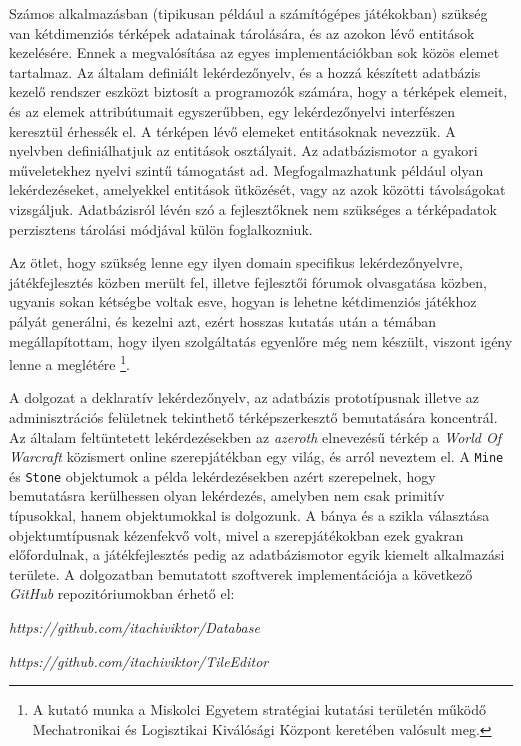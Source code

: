 
Számos alkalmazásban (tipikusan például a számítógépes játékokban) szükség  van kétdimenziós térképek adatainak tárolására, és az azokon lévő entitások kezelésére. Ennek a megvalósítása az egyes implementációkban sok közös elemet tartalmaz. Az általam definiált lekérdezőnyelv, és a hozzá készített adatbázis kezelő rendszer eszközt biztosít a programozók számára, hogy a térképek elemeit, és az elemek attribútumait egyszerűbben, egy lekérdezőnyelvi interfészen keresztül érhessék el. A térképen lévő elemeket entitásoknak nevezzük. A nyelvben definiálhatjuk az entitások osztályait. Az adatbázismotor a gyakori műveletekhez nyelvi szintű támogatást ad. Megfogalmazhatunk például olyan lekérdezéseket, amelyekkel entitások ütközését, vagy az azok közötti távolságokat vizsgáljuk. Adatbázisról lévén szó a fejlesztőknek nem szükséges a térképadatok perzisztens tárolási módjával külön foglalkozniuk.

Az ötlet, hogy szükség lenne egy ilyen domain specifikus lekérdezőnyelvre, játékfejlesztés közben merült fel, illetve fejlesztői fórumok olvasgatása közben, ugyanis sokan kétségbe voltak esve, hogyan is lehetne kétdimenziós játékhoz pályát generálni, és kezelni azt, ezért hosszas kutatás után a témában megállapítottam, hogy ilyen szolgáltatás egyenlőre még nem készült, viszont igény lenne a meglétére
\footnote{A kutató munka a Miskolci Egyetem stratégiai kutatási területén működő  Mechatronikai és Logisztikai Kiválósági Központ keretében valósult meg.}.

A dolgozat a deklaratív lekérdezőnyelv, az adatbázis prototípusnak illetve az adminisztrációs felületnek tekinthető térképszerkesztő bemutatására koncentrál. Az általam feltüntetett lekérdezésekben az \textit{azeroth} elnevezésű térkép a \textit{World Of Warcraft} közismert online szerepjátékban egy világ, és arról neveztem el. A \texttt{Mine} és \texttt{Stone} objektumok a példa lekérdezésekben azért szerepelnek, hogy bemutatásra kerülhessen olyan lekérdezés, amelyben nem csak primitív típusokkal, hanem objektumokkal is dolgozunk. A bánya és a szikla választása objektumtípusnak kézenfekvő volt, mivel a szerepjátékokban ezek gyakran előfordulnak, a játékfejlesztés pedig az adatbázismotor egyik kiemelt alkalmazási területe. A dolgozatban bemutatott szoftverek implementációja a következő \textit{GitHub} repozitóriumokban érhető el:

\textit{https://github.com/itachiviktor/Database}

\textit{https://github.com/itachiviktor/TileEditor}
